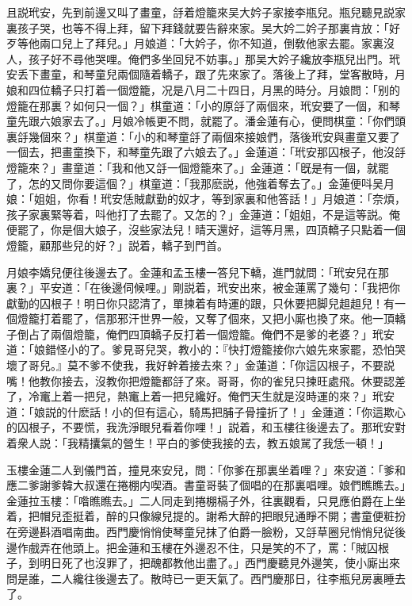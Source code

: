 且説玳安，先到前邊又叫了畫童，㧱着燈籠來吴大妗子家接李瓶兒。瓶兒聽見説家裏孩子哭，也等不得上拜，留下拜錢就要告辭來家。吴大妗二妗子那裏肯放：「好歹等他兩口兒上了拜兒。」月娘道：「大妗子，你不知道，倒敎他家去罷。家裏沒人，孩子好不尋他哭哩。俺們多坐回兒不妨事。」那吴大妗子纔放李瓶兒出門。玳安丢下畫童，和琴童兒兩個隨着轎子，跟了先來家了。落後上了拜，堂客散時，月娘和四位轎子只打着一個燈籠，况是八月二十四日，月黑的時分。月娘問：「别的燈籠在那裏？如何只一個？」棋童道：「小的原㧱了兩個來，玳安要了一個，和琴童先跟六娘家去了。」月娘冷帳更不問，就罷了。潘金蓮有心，便問棋童：「你們頭裏㧱幾個來？」棋童道：「小的和琴童㧱了兩個來接娘們，落後玳安與畫童又要了一個去，把畫童換下，和琴童先跟了六娘去了。」金蓮道：「玳安那囚根子，他沒㧱燈籠來？」畫童道：「我和他又㧱一個燈籠來了。」金蓮道：「旣是有一個，就罷了，怎的又問你要這個？」棋童道：「我那麽説，他強着奪去了。」金蓮便呌吴月娘：「姐姐，你看！玳安恁賊獻勤的奴才，等到家裏和他答話！」月娘道：「奈煩，孩子家裏緊等着，呌他打了去罷了。又怎的？」金蓮道：「姐姐，不是這等説。俺便罷了，你是個大娘子，沒些家法兒！晴天還好，這等月黑，四頂轎子只點着一個燈籠，顧那些兒的好？」説着，轎子到門首。

月娘李嬌兒便往後邊去了。金蓮和孟玉樓一答兒下轎，進門就問：「玳安兒在那裏？」平安道：「在後邊伺候哩。」剛説着，玳安出來，被金蓮罵了幾句：「我把你獻勤的囚根子！明日你只認清了，單揀着有時運的跟，只休要把脚兒趄趄兒！有一個燈籠打着罷了，信那邪汗世界一般，又奪了個來，又把小廝也換了來。他一頂轎子倒占了兩個燈籠，俺們四頂轎子反打着一個燈籠。俺們不是爹的老婆？」玳安道：「娘錯怪小的了。爹見哥兒哭，教小的：『快打燈籠接你六娘先來家罷，恐怕哭壞了哥兒。』莫不爹不使我，我好幹着接去來？」金蓮道：「你這囚根子，不要説嘴！他教你接去，沒教你把燈籠都㧱了來。哥哥，你的雀兒只揀旺處飛。休要認差了，冷竃上着一把兒，熱竃上着一把兒纔好。俺們天生就是沒時運的來？」玳安道：「娘説的什麽話！小的但有這心，騎馬把脯子骨撞折了！」金蓮道：「你這欺心的囚根子，不要慌，我洗淨眼兒看着你哩！」説着，和玉樓往後邊去了。那玳安對着衆人説：「我精攮氣的營生！平白的爹使我接的去，教五娘駡了我恁一頓！」

玉樓金蓮二人到儀門首，撞見來安兒，問：「你爹在那裏坐着哩？」來安道：「爹和應二爹謝爹韓大叔還在捲棚内喫酒。書童哥裝了個唱的在那裏唱哩。娘們瞧瞧去。」金蓮拉玉樓：「喒瞧瞧去。」二人同走到捲棚槅子外，往裏觀看，只見應伯爵在上坐着，把帽兒歪挺着，醉的只像線兒提的。謝希大醉的把眼兒通睜不開；書童便粧扮在旁邊斟酒唱南曲。西門慶悄悄使琴童兒抹了伯爵一臉粉，又㧱草圈兒悄悄兒従後邊作戲弄在他頭上。把金蓮和玉樓在外邊忍不住，只是笑的不了，罵：「賊囚根子，到明日死了也沒罪了，把醜都教他出盡了。」西門慶聽見外邊笑，使小廝出來問是誰，二人纔往後邊去了。散時已一更天氣了。西門慶那日，往李瓶兒房裏睡去了。

